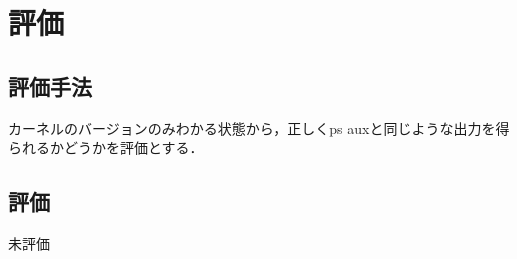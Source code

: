 \chapter{評価}
\label{chap:evaluation}

\section{評価手法}

カーネルのバージョンのみわかる状態から，正しくps auxと同じような出力を得られるかどうかを評価とする．

\section{評価}

未評価
